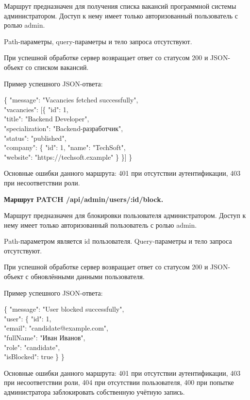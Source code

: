 Маршрут предназначен для получения списка вакансий программной системы администратором. Доступ к нему имеет только авторизованный пользователь с ролью admin.

Path-параметры, query-параметры и тело запроса отсутствуют.

При успешной обработке сервер возвращает ответ со статусом 200 и JSON-объект со списком вакансий.

Пример успешного JSON-ответа:

\begin{flushleft}
	\small\ttfamily
	\{ "message": "Vacancies fetched successfully",\\
	"vacancies": [\{ "id": 1,\\
	"title": "Backend Developer",\\
	"specialization": "Backend-разработчик",\\
	"status": "published",\\
	"company": \{ "id": 1, "name": "TechSoft",\\
	"website": "https://techsoft.example" \} \}] \}
\end{flushleft}

Основные ошибки данного маршрута: 401 при отсутствии аутентификации, 403 при несоответствии роли.

\textbf{Маршрут PATCH /api/admin/users/:id/block.}

Маршрут предназначен для блокировки пользователя администратором. Доступ к нему имеет только авторизованный пользователь с ролью admin.

Path-параметром является id пользователя. Query-параметры и тело запроса отсутствуют.

При успешной обработке сервер возвращает ответ со статусом 200 и JSON-объект с обновлёнными данными пользователя.

Пример успешного JSON-ответа:

\begin{flushleft}
	\small\ttfamily
	\{ "message": "User blocked successfully",\\
	"user": \{ "id": 1,\\
	"email": "candidate@example.com",\\
	"fullName": "Иван Иванов",\\
	"role": "candidate",\\
	"isBlocked": true \} \}
\end{flushleft}

Основные ошибки данного маршрута: 401 при отсутствии аутентификации, 403 при несоответствии роли, 404 при отсутствии пользователя, 400 при попытке администратора заблокировать собственную учётную запись.

